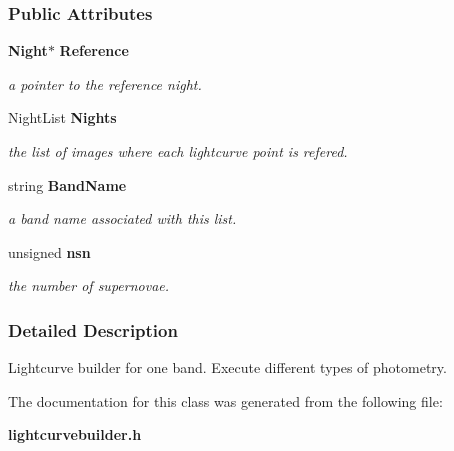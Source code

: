 \subsubsection*{Public Attributes}
\begin{CompactItemize}
\item 
{}
{\bf Night}$\ast$ {\bf Reference}\label{class_lightcurvebuilder_m0}

\begin{CompactList}\small\item\em a pointer to the reference night.\item\end{CompactList}\item 
{}
Night\-List {\bf Nights}\label{class_lightcurvebuilder_m1}

\begin{CompactList}\small\item\em the list of images where each lightcurve point is refered.\item\end{CompactList}\item 
{}
string {\bf Band\-Name}\label{class_lightcurvebuilder_m2}

\begin{CompactList}\small\item\em a band name associated with this list.\item\end{CompactList}\item 
{}
unsigned {\bf nsn}\label{class_lightcurvebuilder_m3}

\begin{CompactList}\small\item\em the number of supernovae.\item\end{CompactList}\end{CompactItemize}


\subsubsection{Detailed Description}
Lightcurve builder for one band. Execute different types of photometry.



The documentation for this class was generated from the following file:\begin{CompactItemize}
\item 
{\bf lightcurvebuilder.h}\end{CompactItemize}
